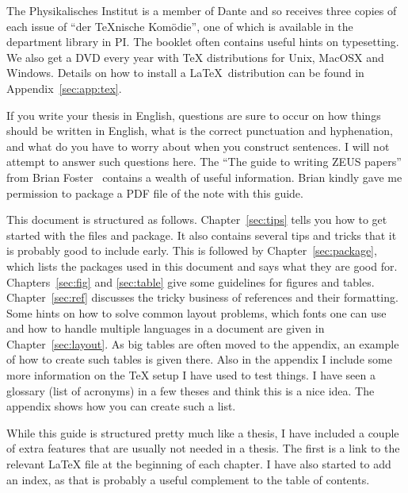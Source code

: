 The Physikalisches Institut is a member of Dante and so receives three
copies of each issue of \foreignquote{ngerman}{der TeXnische Komödie},
one of which is available in the department library in PI.  The
booklet often contains useful hints on typesetting. We also get a DVD
every year with \TeX{}
distributions for Unix, MacOSX and Windows. Details on how to install
a \LaTeX\ distribution can be found in Appendix~\ref{sec:app:tex}.

If you write your thesis in English, questions are sure
to occur on how things should be written in English, what is the
correct punctuation and hyphenation, and what do you have to worry
about when you construct sentences. I will not attempt to answer such
questions here. The \enquote{The guide to writing ZEUS
  papers} from Brian Foster~\cite{ZEUSGuide}
contains a wealth of useful information. Brian kindly gave me
permission to package a PDF file of the note with this guide.

This document is structured as follows. Chapter~\ref{sec:tips} tells
you how to get started with the files and package. It also contains
several tips and tricks that it is probably good to include early.
This is followed by Chapter~\ref{sec:package}, which lists the
packages used in this document and says what they are good
for. Chapters~\ref{sec:fig} and \ref{sec:table} give some guidelines
for figures and tables. Chapter~\ref{sec:ref} discusses the tricky
business of references and their formatting. Some hints on how to
solve common layout problems, which fonts one can use and how to
handle multiple languages in a document are given in
Chapter~\ref{sec:layout}. As big tables are often moved to the
appendix, an example of how to create such tables is given there. Also
in the appendix I include some more information on the \TeX{} setup I
have used to test things. I have seen a glossary (list of acronyms) in
a few theses and think this is a nice idea. The appendix shows how you
can create such a list.

While this guide is structured pretty much like a thesis, I have
included a couple of extra features that are usually not needed in a
thesis. The first is a link to the relevant \LaTeX{} file at the
beginning of each chapter. I have also started to add an index, as
that is probably a useful complement to the table of contents.


